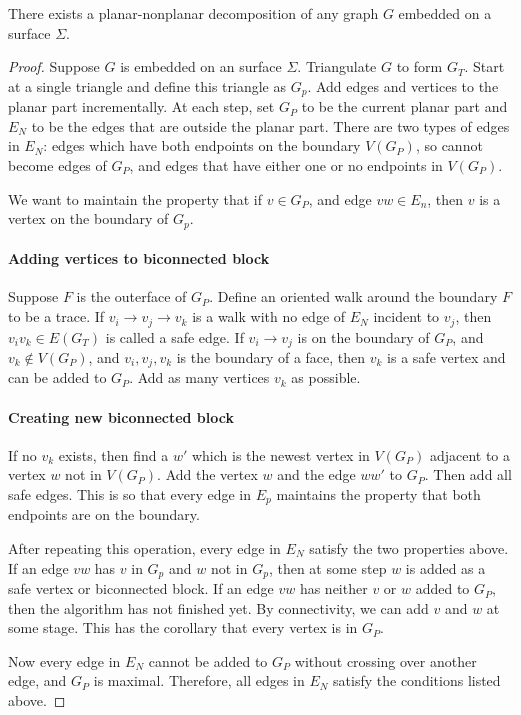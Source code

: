 \begin{claim}
	There exists a planar-nonplanar decomposition of any graph $G$ embedded on a surface $\Sigma$. 
\end{claim}
\begin{proof}
	Suppose \(G\) is embedded on an surface \(\Sigma\). Triangulate \(G\) to form \(G_T\). Start at a single triangle and define this triangle as $G_p$. Add edges and vertices to the planar part incrementally. At each step, set \(G_P\) to be the current planar part and \(E_N\) to be the edges that are outside the planar part. There are two types of edges in \(E_N\): edges which have both endpoints on the boundary \(V(G_P)\), so cannot become edges of \(G_P\), and edges that have either one or no endpoints in \(V(G_P)\).
	
	We want to maintain the property that if \(v \in G_P\), and edge \(vw \in E_n\), then \(v\) is a vertex on the boundary of \(G_p\).
	\paragraph{Adding vertices to biconnected block}
	Suppose $F$ is the outerface of \(G_P\). Define an oriented walk around the boundary $F$ to be a trace. If \(v_i \rightarrow v_j \rightarrow v_k\) is a walk with no edge of \(E_N\) incident to \(v_j\), then \(v_i v_k \in E(G_T)\) is called a safe edge. If \(v_i \rightarrow v_j\) is on the boundary of \(G_P\), and \(v_k \notin V(G_P)\), and \(v_i,v_j,v_k\) is the boundary of a face, then \(v_k\) is a safe vertex and can be added to \(G_P\). Add as many vertices $v_k$ as possible. 
	\paragraph{Creating new biconnected block}
	If no \(v_k\) exists, then find a \(w'\) which is the newest vertex in \(V(G_P)\) adjacent to a vertex \(w\) not in \(V(G_P)\). Add the vertex \(w\) and the edge \(w w'\) to \(G_P\). Then add all safe edges. This is so that every edge in \(E_p\) maintains the property that both endpoints are on the boundary.
	
	After repeating this operation, every edge in \(E_N\) satisfy the two properties above. If an edge \(vw\) has \(v\) in $G_p$ and $w$ not in $G_p$, then at some step \(w\) is added as a safe vertex or biconnected block. If an edge \(vw\) has neither \(v\) or \(w\) added to \(G_P\), then the algorithm has not finished yet. By connectivity, we can add \(v\) and \(w\) at some stage. This has the corollary that every vertex is in \(G_P\).
	
	Now every edge in \(E_N\) cannot be added to \(G_P\) without crossing over another edge, and \(G_P\) is maximal. Therefore, all edges in \(E_N\) satisfy the conditions listed above.
\end{proof}

